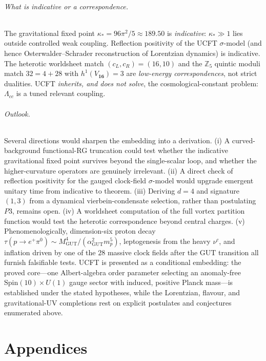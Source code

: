 \documentclass[11pt]{article}
\theoremstyle{plain}
\theoremstyle{definition}
\theoremstyle{remark}
\begin{document}
\paragraph{What is indicative or a correspondence.}
The gravitational fixed point $\kappa_{\ast}=96\pi^{2}/5\approx189.50$ is
\emph{indicative}: $\kappa_{\ast}\gg1$ lies outside controlled weak
coupling. Reflection positivity of the UCFT $\sigma$-model (and hence
Osterwalder--Schrader reconstruction of Lorentzian dynamics) is
indicative. The heterotic worldsheet match $(c_{L},c_{R})=(16,10)$ and
the $\mathbb{Z}_{5}$ quintic moduli match $32=4+28$ with
$h^{1}(V_{\mathbf{16}})=3$ are \emph{low-energy correspondences}, not
strict dualities. UCFT \emph{inherits, and does not solve}, the
cosmological-constant problem: $\Lambda_{cc}$ is a tuned relevant
coupling.

\paragraph{Outlook.}
Several directions would sharpen the embedding into a derivation. (i) A
curved-background functional-RG truncation could test whether the
indicative gravitational fixed point survives beyond the single-scalar
loop, and whether the higher-curvature operators are genuinely
irrelevant. (ii) A direct check of reflection positivity for the gauged
clock-field $\sigma$-model would upgrade emergent unitary time from
indicative to theorem. (iii) Deriving $d=4$ and signature $(1,3)$ from a
dynamical vierbein-condensate selection, rather than postulating $P3$,
remains open. (iv) A worldsheet computation of the full
vortex partition function would test the heterotic correspondence beyond
central charges. (v) Phenomenologically, dimension-six proton decay
$\tau(p\to e^{+}\pi^{0})\sim M_{\mathrm{GUT}}^{4}/(\alpha_{\mathrm{GUT}}^{2}
m_{p}^{5})$, leptogenesis from the heavy $\nu^{c}$, and inflation driven
by one of the $28$ massive clock fields after the GUT transition all
furnish falsifiable tests. UCFT is presented as a conditional embedding:
the proved core---one Albert-algebra order parameter selecting an
anomaly-free $\mathrm{Spin}(10)\times U(1)$ gauge sector with induced,
positive Planck mass---is established under the stated hypotheses, while the
Lorentzian, flavour, and gravitational-UV completions rest on explicit
postulates and conjectures enumerated above.

\appendix
\part{Appendices}
\end{document}
